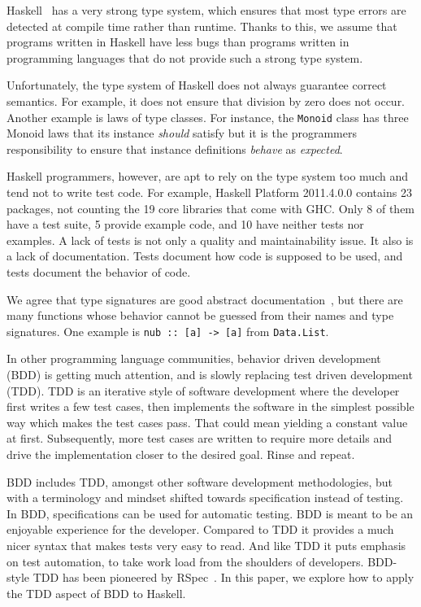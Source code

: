 \documentclass[preprint]{sigplanconf}
\begin{document}

Haskell~\cite{haskell} has a very strong type system, which ensures that most type errors are
detected at compile time rather than runtime.  Thanks to this, we assume that
programs written in Haskell have less bugs than programs written in programming
languages that do not provide such a strong type system.

Unfortunately, the type system of Haskell does not always guarantee
correct semantics.
For example, it does not ensure that division by zero does not occur.
Another example is laws of type classes.
For instance, the {\tt Monoid} class has three Monoid laws
that its instance \emph{should} satisfy
but
it is the programmers responsibility to ensure that
instance definitions \emph{behave} as \emph{expected}.

Haskell programmers, however, are apt to rely on the type system too
much and tend not to write test code.  For example, Haskell
Platform 2011.4.0.0 contains 23 packages, not counting the 19 core
libraries that come with GHC.  Only 8 of them have a test suite, 5
provide example code, and 10 have neither tests nor examples.
A lack of tests is not only a quality and maintainability issue.  It
also is a lack of documentation.  Tests document how code is supposed
to be used, and tests document the behavior of code.

We agree that type signatures are good abstract documentation~\cite{free}, but
there are many functions whose behavior cannot be guessed from their names and
type signatures.  One example is \verb|nub :: [a] -> [a]| from {\tt Data.List}.

In other programming language communities, behavior driven development
(BDD) is getting much attention, and is slowly replacing test driven
development (TDD).  TDD is an iterative style of software development
where the developer first writes a few test cases, then implements the
software in the simplest possible way which makes the test cases pass.
That could mean yielding a constant value at first.  Subsequently,
more test cases are written to require more details and drive the
implementation closer to the desired goal.  Rinse and repeat.

BDD includes TDD, amongst other software development methodologies,
but with a terminology and mindset shifted towards
specification instead of testing.
In BDD, specifications can be used for
automatic testing.
BDD is meant to be an enjoyable experience for the developer.
Compared to TDD it provides a much nicer syntax that
makes tests very easy to read.  And like TDD it puts emphasis on
test automation, to take work load from the shoulders of
developers.
BDD-style TDD has been pioneered by
RSpec~\cite{rspec}.  In this paper, we explore how to apply the TDD
aspect of BDD to Haskell.
\end{document}
